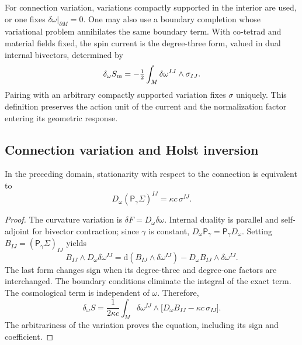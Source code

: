 For connection variation, variations compactly supported
in the interior are used, or one fixes
\(\delta\omega|_{\partial M}=0\). One may also use a
boundary completion whose variational problem annihilates the same
boundary term. With co-tetrad and material fields fixed, the spin current
is the degree-three form, valued in dual internal bivectors,
determined by
\begin{equation}
 \delta_\omega S_{\rm m}
 =-\tfrac12\int_M\delta\omega^{IJ}\wedge\sigma_{IJ}.
 \label{vii:eq:corriente-variacional}
\end{equation}
Pairing with an arbitrary compactly supported variation fixes
\(\sigma\) uniquely. This definition preserves the action unit
of the current and the normalization factor entering its
geometric response.

\subsection{Connection variation and Holst inversion}
\label{vii:subsec:variacion-holst}

\begin{theorem}
\label{vii:thm:ecuacion-cartan-holst}
In the preceding domain, stationarity with respect to the connection
is equivalent to
\begin{equation}
 D_\omega(\mathsf P_\gamma\Sigma)^{IJ}
       =\kappa c\,\sigma^{IJ}.
 \label{vii:eq:ecuacion-cartan-holst}
\end{equation}
\end{theorem}
\begin{proof}
The curvature variation is
\(\delta F=D_\omega\delta\omega\). Internal duality is parallel
and self-adjoint for bivector contraction; since \(\gamma\) is
constant, \(D_\omega\mathsf P_\gamma=\mathsf P_\gamma D_\omega\).
Setting \(B_{IJ}=(\mathsf P_\gamma\Sigma)_{IJ}\) yields
\[
 B_{IJ}\wedge D_\omega\delta\omega^{IJ}
 =\mathrm d(B_{IJ}\wedge\delta\omega^{IJ})
   -D_\omega B_{IJ}\wedge\delta\omega^{IJ}.
\]
The last form changes sign when its degree-three and degree-one factors
are interchanged. The boundary conditions eliminate the integral of
the exact term. The cosmological term is independent of \(\omega\).
Therefore,
\[
 \delta_\omega S=
 \frac1{2\kappa c}\int_M\delta\omega^{IJ}\wedge
       \bigl[D_\omega B_{IJ}-\kappa c\,\sigma_{IJ}\bigr].
\]
The arbitrariness of the variation proves the equation, including its sign
and coefficient.
\end{proof}

